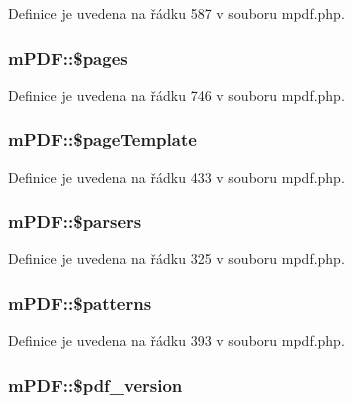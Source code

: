 Definice je uvedena na řádku 587 v souboru mpdf.\-php.

\hypertarget{classm_p_d_f_ab2122e2377682bed0ef2c9c10f2b4487}{
\subsubsection[{\$pages}]{\setlength{\rightskip}{0pt plus 5cm}m\-P\-D\-F\-::\$pages}}\label{classm_p_d_f_ab2122e2377682bed0ef2c9c10f2b4487}


Definice je uvedena na řádku 746 v souboru mpdf.\-php.

\hypertarget{classm_p_d_f_af6882063073624318e467219ffc721f4}{
\subsubsection[{\$page\-Template}]{\setlength{\rightskip}{0pt plus 5cm}m\-P\-D\-F\-::\$page\-Template}}\label{classm_p_d_f_af6882063073624318e467219ffc721f4}


Definice je uvedena na řádku 433 v souboru mpdf.\-php.

\hypertarget{classm_p_d_f_a29a1f946c020074761ba32668ea90636}{
\subsubsection[{\$parsers}]{\setlength{\rightskip}{0pt plus 5cm}m\-P\-D\-F\-::\$parsers}}\label{classm_p_d_f_a29a1f946c020074761ba32668ea90636}


Definice je uvedena na řádku 325 v souboru mpdf.\-php.

\hypertarget{classm_p_d_f_a24ef23874090c250a7ece9fa437f0cc0}{
\subsubsection[{\$patterns}]{\setlength{\rightskip}{0pt plus 5cm}m\-P\-D\-F\-::\$patterns}}\label{classm_p_d_f_a24ef23874090c250a7ece9fa437f0cc0}


Definice je uvedena na řádku 393 v souboru mpdf.\-php.

\hypertarget{classm_p_d_f_a315188774fa5539ebb7cc08c650de5df}{
\subsubsection[{\$pdf\-\_\-version}]{\setlength{\rightskip}{0pt plus 5cm}m\-P\-D\-F\-::\$pdf\-\_\-version}}\label{classm_p_d_f_a315188774fa5539ebb7cc08c650de5df}


